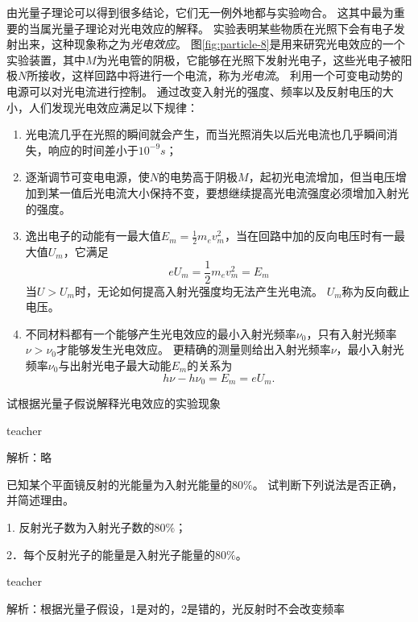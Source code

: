 由光量子理论可以得到很多结论，它们无一例外地都与实验吻合。
这其中最为重要的当属光量子理论对光电效应的解释。
实验表明某些物质在光照下会有电子发射出来，这种现象称之为\emph{光电效应}。
图\ref{fig:particle-8}是用来研究光电效应的一个实验装置，其中$M$为光电管的阴极，它能够在光照下发射光电子，这些光电子被阳极$N$所接收，这样回路中将进行一个电流，称为\emph{光电流}。
利用一个可变电动势的电源可以对光电流进行控制。
通过改变入射光的强度、频率以及反射电压的大小，人们发现光电效应满足以下规律：
\begin{enumerate}
\item 光电流几乎在光照的瞬间就会产生，而当光照消失以后光电流也几乎瞬间消失，响应的时间差小于$10^{-9}\unit{s}$；
\item 逐渐调节可变电电源，使$N$的电势高于阴极$M$，起初光电流增加，但当电压增加到某一值后光电流大小保持不变，要想继续提高光电流强度必须增加入射光的强度。
\item 逸出电子的动能有一最大值$E_m = \frac{1}{2}m_ev_m^2$，当在回路中加的反向电压时有一最大值$U_m$，它满足
\begin{equation}
eU_m = \frac{1}{2}m_ev_m^2 = E_m
\end{equation}
当$U>U_m$时，无论如何提高入射光强度均无法产生光电流。
$U_m$称为反向截止电压。
\item 不同材料都有一个能够产生光电效应的最小入射光频率$\nu_0$，只有入射光频率$\nu>\nu_0$才能够发生光电效应。
更精确的测量则给出入射光频率$\nu$，最小入射光频率$\nu_0$与出射光电子最大动能$E_m$的关系为
\begin{equation}
h\nu-h\nu_0 = E_m = eU_m.
\end{equation}
\end{enumerate}

\begin{example}

试根据光量子假说解释光电效应的实验现象
\begin{taggedblock}{teacher}

解析：略
\end{taggedblock}
\end{example}


\begin{example}

已知某个平面镜反射的光能量为入射光能量的$80 \%$。
试判断下列说法是否正确，并简述理由。

1. 反射光子数为入射光子数的$80  \%$；


2．每个反射光子的能量是入射光子能量的$80 \%$。


\begin{taggedblock}{teacher}

解析：根据光量子假设，1是对的，2是错的，光反射时不会改变频率
\end{taggedblock}
\end{example}


